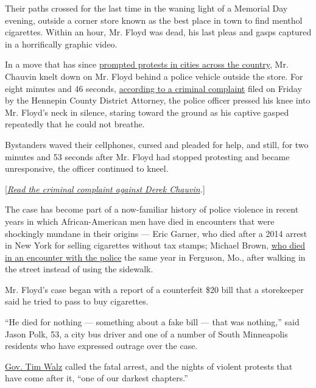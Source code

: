 Their paths crossed for the last time in the waning light of a Memorial
Day evening, outside a corner store known as the best place in town to
find menthol cigarettes. Within an hour, Mr. Floyd was dead, his last
pleas and gasps captured in a horrifically graphic video.

In a move that has since
\href{https://www.nytimes3xbfgragh.onion/2020/05/29/us/minneapolis-protests-george-floyd-death.html}{prompted
protests in cities across the country}, Mr. Chauvin knelt down on Mr.
Floyd behind a police vehicle outside the store. For eight minutes and
46 seconds,
\href{https://www.nytimes3xbfgragh.onion/2020/05/29/us/derek-chauvin-criminal-complaint.html}{according
to a criminal complaint} filed on Friday by the Hennepin County District
Attorney, the police officer pressed his knee into Mr. Floyd's neck in
silence, staring toward the ground as his captive gasped repeatedly that
he could not breathe.

Bystanders waved their cellphones, cursed and pleaded for help, and
still, for two minutes and 53 seconds after Mr. Floyd had stopped
protesting and became unresponsive, the officer continued to kneel.

{[}\href{https://www.nytimes3xbfgragh.onion/2020/05/29/us/derek-chauvin-criminal-complaint.html}{\emph{Read
the criminal complaint against Derek Chauvin}}\emph{.}{]}

The case has become part of a now-familiar history of police violence in
recent years in which African-American men have died in encounters that
were shockingly mundane in their origins --- Eric Garner, who died after
a 2014 arrest in New York for selling cigarettes without tax stamps;
Michael Brown,
\href{https://www.nytimes3xbfgragh.onion/interactive/2014/08/13/us/ferguson-missouri-town-under-siege-after-police-shooting.html}{who
died in an encounter with the police} the same year in Ferguson, Mo.,
after walking in the street instead of using the sidewalk.

Mr. Floyd's case began with a report of a counterfeit \$20 bill that a
storekeeper said he tried to pass to buy cigarettes.

``He died for nothing --- something about a fake bill --- that was
nothing,'' said Jason Polk, 53, a city bus driver and one of a number of
South Minneapolis residents who have expressed outrage over the case.

\href{https://www.nytimes3xbfgragh.onion/2020/05/29/us/tim-walz-minnesota-governor.html}{Gov.
Tim Walz} called the fatal arrest, and the nights of violent protests
that have come after it, ``one of our darkest chapters.''

